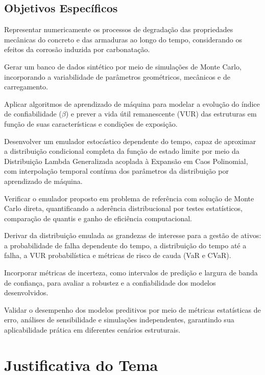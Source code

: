 \subsection{Objetivos Específicos}

\begin{alineas}
    \item Representar numericamente os processos de degradação das propriedades mecânicas do concreto e das armaduras ao longo do tempo, considerando os efeitos da corrosão induzida por carbonatação.
    \item Gerar um banco de dados sintético por meio de simulações de Monte Carlo, incorporando a variabilidade de parâmetros geométricos, mecânicos e de carregamento.
    \item Aplicar algoritmos de aprendizado de máquina para modelar a evolução do índice de confiabilidade ($\beta$) e prever a vida útil remanescente (VUR) das estruturas em função de suas características e condições de exposição.
    \item Desenvolver um emulador estocástico dependente do tempo, capaz de aproximar a distribuição condicional completa da função de estado limite por meio da Distribuição Lambda Generalizada acoplada à Expansão em Caos Polinomial, com interpolação temporal contínua dos parâmetros da distribuição por aprendizado de máquina.
    \item Verificar o emulador proposto em problema de referência com solução de Monte Carlo direta, quantificando a aderência distribucional por testes estatísticos, comparação de quantis e ganho de eficiência computacional.
    \item Derivar da distribuição emulada as grandezas de interesse para a gestão de ativos: a probabilidade de falha dependente do tempo, a distribuição do tempo até a falha, a VUR probabilística e métricas de risco de cauda (VaR e CVaR).
    \item Incorporar métricas de incerteza, como intervalos de predição e largura de banda de confiança, para avaliar a robustez e a confiabilidade dos modelos desenvolvidos.
    \item Validar o desempenho dos modelos preditivos por meio de métricas estatísticas de erro, análises de sensibilidade e simulações independentes, garantindo sua aplicabilidade prática em diferentes cenários estruturais.
\end{alineas}


\section{Justificativa do Tema}


